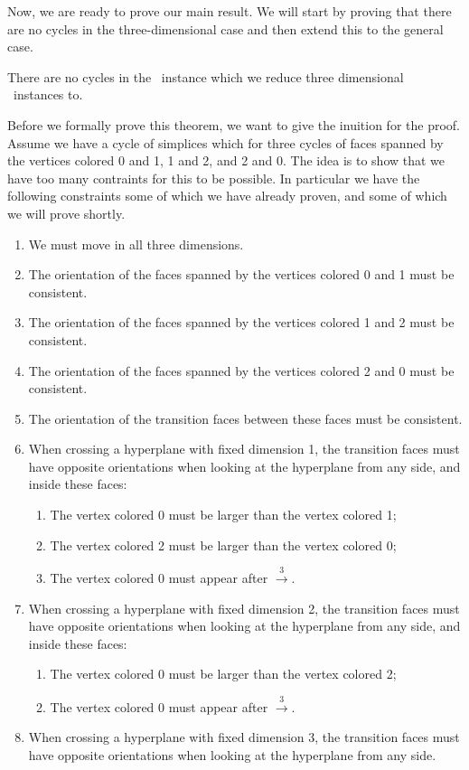 Now, we are ready to prove our main result. We will start by proving that there are no cycles in the three-dimensional case and then extend this to the general case.

\begin{theorem}\label{thm:no_cycles_in_three_dimensional_tarskistar}
	There are no cycles in the \EndOfLine\ instance which we reduce three dimensional \Tarskistar\ instances to.
\end{theorem}

Before we formally prove this theorem, we want to give the inuition for the proof. Assume we have a cycle of simplices which for three cycles of faces spanned by the vertices colored 0 and 1, 1 and 2, and 2 and 0. The idea is to show that we have too many contraints for this to be possible. In particular we have the following constraints some of which we have already proven, and some of which we will prove shortly.
\begin{enumerate}
	\item We must move in all three dimensions.
	\item The orientation of the faces spanned by the vertices colored 0 and 1 must be consistent.
	\item The orientation of the faces spanned by the vertices colored 1 and 2 must be consistent.
	\item The orientation of the faces spanned by the vertices colored 2 and 0 must be consistent.
	\item The orientation of the transition faces between these faces must be consistent.
	\item When crossing a hyperplane with fixed dimension 1, the transition faces must have opposite orientations when looking at the hyperplane from any side, and inside these faces:
	      \begin{enumerate}
		      \item The vertex colored 0 must be larger than the vertex colored 1;
		      \item The vertex colored 2 must be larger than the vertex colored 0;
		      \item The vertex colored 0 must appear after $\xrightarrow{3}$.
	      \end{enumerate}
	\item When crossing a hyperplane with fixed dimension 2, the transition faces must have opposite orientations when looking at the hyperplane from any side, and inside these faces:
	      \begin{enumerate}
		      \item The vertex colored 0 must be larger than the vertex colored 2;
		      \item The vertex colored 0 must appear after $\xrightarrow{3}$.
	      \end{enumerate}
	\item When crossing a hyperplane with fixed dimension 3, the transition faces must have opposite orientations when looking at the hyperplane from any side.
\end{enumerate}
